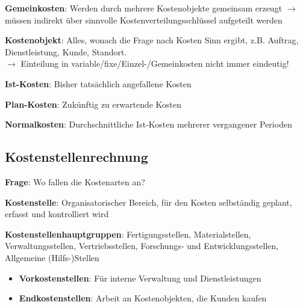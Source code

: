 \textbf{Gemeinkosten}: Werden durch mehrere Kostenobjekte gemeinsam erzeugt $\rightarrow$ müssen indirekt über sinnvolle Kostenverteilungsschlüssel aufgeteilt werden

\textbf{Kostenobjekt}: Alles, wonach die Frage nach Kosten Sinn ergibt, z.B. Auftrag, Dienstleistung, Kunde, Standort.\\
$\rightarrow$ Einteilung in variable/fixe/Einzel-/Gemeinkosten nicht immer eindeutig!

\textbf{Ist-Kosten}: Bisher tatsächlich angefallene Kosten

\textbf{Plan-Kosten}: Zukünftig zu erwartende Kosten

\textbf{Normalkosten}: Durchschnittliche Ist-Kosten mehrerer vergangener Perioden

\subsection{Kostenstellenrechnung}
\textbf{Frage}: Wo fallen die Kostenarten an?

\textbf{Kostenstelle}: Organisatorischer Bereich, für den Kosten selbständig geplant, erfasst und
kontrolliert wird

\textbf{Kostenstellenhauptgruppen}: Fertigungsstellen, Materialstellen, Verwaltungsstellen, Vertriebsstellen, Forschungs- und Entwicklungsstellen, Allgemeine (Hilfs-)Stellen
\begin{itemize}
	\item \textbf{Vorkostenstellen}: Für interne Verwaltung und Dienstleistungen
	\item \textbf{Endkostenstellen}: Arbeit an Kostenobjekten, die Kunden kaufen
\end{itemize}

